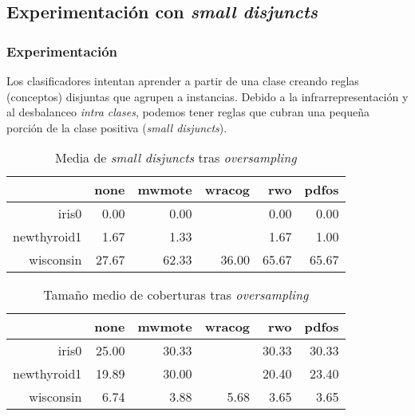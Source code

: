 \subsection{Experimentación con \textit{small disjuncts}}
\fontsize{8pt}{0}\selectfont
\begin{frame}\frametitle{Experimentación}
 \vspace{2em}
 Los clasificadores intentan aprender a partir de una clase 
 creando reglas (conceptos) disjuntas que agrupen a instancias. Debido a la infrarrepresentación y al 
 desbalanceo \textit{intra clases}, podemos tener reglas que cubran una pequeña porción de la clase 
 positiva (\textit{small disjuncts}).
  \begin{table}[H]
  \centering
  \begin{tabular}{rrrrrr}
  \hline
  & none & mwmote & wracog & rwo & pdfos \\ 
  \hline
  iris0 & 0.00 & 0.00 &  & 0.00 & 0.00 \\ 
  newthyroid1 & 1.67 & 1.33 &  & 1.67 & 1.00 \\ 
  wisconsin & 27.67 & 62.33 & 36.00 & 65.67 & 65.67 \\ 
  \hline
  \end{tabular}
  \caption{Media de \textit{small disjuncts} tras \textit{oversampling}}
  \end{table}

  \vspace{-2em}
  
  \begin{table}[H]
  \centering
  \begin{tabular}{rrrrrr}
  \hline
  & none & mwmote & wracog & rwo & pdfos \\ 
  \hline
  iris0 & 25.00 & 30.33 &  & 30.33 & 30.33 \\ 
  newthyroid1 & 19.89 & 30.00 &  & 20.40 & 23.40 \\ 
  wisconsin & 6.74 & 3.88 & 5.68 & 3.65 & 3.65 \\ 
  \hline
  \end{tabular}
  \caption{Tamaño medio de coberturas tras \textit{oversampling}}
  \end{table}
  
  \vspace{-2em}
  

\end{frame}
